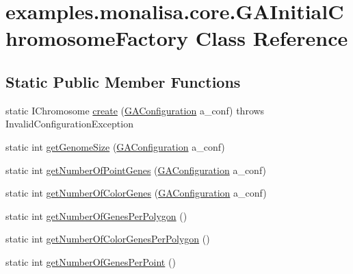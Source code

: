 \hypertarget{classexamples_1_1monalisa_1_1core_1_1_g_a_initial_chromosome_factory}{\section{examples.\-monalisa.\-core.\-G\-A\-Initial\-Chromosome\-Factory Class Reference}
\label{classexamples_1_1monalisa_1_1core_1_1_g_a_initial_chromosome_factory}
}
\subsection*{Static Public Member Functions}
\begin{DoxyCompactItemize}
\item 
static I\-Chromosome \hyperlink{classexamples_1_1monalisa_1_1core_1_1_g_a_initial_chromosome_factory_ae09a77b358d2976a940f661cdedeb4f6}{create} (\hyperlink{classexamples_1_1monalisa_1_1core_1_1_g_a_configuration}{G\-A\-Configuration} a\-\_\-conf)  throws Invalid\-Configuration\-Exception 
\item 
static int \hyperlink{classexamples_1_1monalisa_1_1core_1_1_g_a_initial_chromosome_factory_a944b366fd856fce1356769b05cafcd5c}{get\-Genome\-Size} (\hyperlink{classexamples_1_1monalisa_1_1core_1_1_g_a_configuration}{G\-A\-Configuration} a\-\_\-conf)
\item 
static int \hyperlink{classexamples_1_1monalisa_1_1core_1_1_g_a_initial_chromosome_factory_ae6bcef90df9469b2acb3f1faa9ee0cab}{get\-Number\-Of\-Point\-Genes} (\hyperlink{classexamples_1_1monalisa_1_1core_1_1_g_a_configuration}{G\-A\-Configuration} a\-\_\-conf)
\item 
static int \hyperlink{classexamples_1_1monalisa_1_1core_1_1_g_a_initial_chromosome_factory_acd6519e17af5a8f081d4468a9a952e6c}{get\-Number\-Of\-Color\-Genes} (\hyperlink{classexamples_1_1monalisa_1_1core_1_1_g_a_configuration}{G\-A\-Configuration} a\-\_\-conf)
\item 
static int \hyperlink{classexamples_1_1monalisa_1_1core_1_1_g_a_initial_chromosome_factory_a2ac8dab6055527138d83a2d40038b22c}{get\-Number\-Of\-Genes\-Per\-Polygon} ()
\item 
static int \hyperlink{classexamples_1_1monalisa_1_1core_1_1_g_a_initial_chromosome_factory_ae451a819fe731532de8b044a55d157a9}{get\-Number\-Of\-Color\-Genes\-Per\-Polygon} ()
\item 
static int \hyperlink{classexamples_1_1monalisa_1_1core_1_1_g_a_initial_chromosome_factory_aec3792f415538597c241d7f8c03f966e}{get\-Number\-Of\-Genes\-Per\-Point} ()
\end{DoxyCompactItemize}
